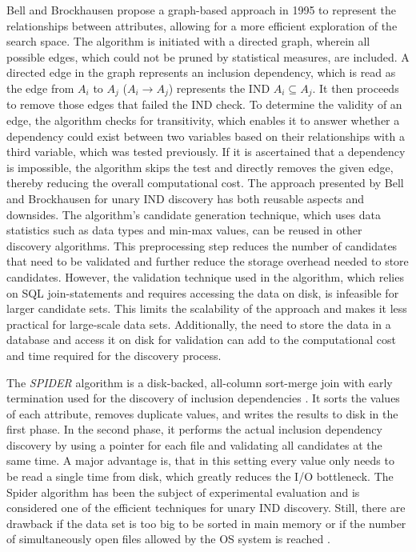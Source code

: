 Bell and Brockhausen \cite{bell1995discovery} propose a graph-based approach in 1995 to represent the relationships between attributes, allowing for a more efficient exploration of the search space. The algorithm is initiated with a directed graph, wherein all possible edges, which could not be pruned by statistical measures, are included. A directed edge in the graph represents an inclusion dependency, which is read as the edge from $A_i$ to $A_j$ ($A_i \rightarrow A_j$) represents the IND $A_i \subseteq A_j$. It then proceeds to remove those edges that failed the IND check. To determine the validity of an edge, the algorithm checks for transitivity, which enables it to answer whether a dependency could exist between two variables based on their relationships with a third variable, which was tested previously. If it is ascertained that a dependency is impossible, the algorithm skips the test and directly removes the given edge, thereby reducing the overall computational cost. The approach presented by Bell and Brockhausen for unary IND discovery has both reusable aspects and downsides. The algorithm's candidate generation technique, which uses data statistics such as data types and min-max values, can be reused in other discovery algorithms. This preprocessing step reduces the number of candidates that need to be validated and further reduce the storage overhead needed to store candidates. However, the validation technique used in the algorithm, which relies on SQL join-statements and requires accessing the data on disk, is infeasible for larger candidate sets. This limits the scalability of the approach and makes it less practical for large-scale data sets. Additionally, the need to store the data in a database and access it on disk for validation can add to the computational cost and time required for the discovery process.

The \textit{SPIDER} algorithm is a disk-backed, all-column sort-merge join with early termination used for the discovery of inclusion dependencies \cite{bauckmann2006efficiently}. It sorts the values of each attribute, removes duplicate values, and writes the results to disk in the first phase. In the second phase, it performs the actual inclusion dependency discovery by using a pointer for each file and validating all candidates at the same time. A major advantage is, that in this setting every value only needs to be read a single time from disk, which greatly reduces the I/O bottleneck. The Spider algorithm has been the subject of experimental evaluation and is considered one of the efficient techniques for unary IND discovery. Still, there are drawback if the data set is too big to be sorted in main memory or if the number of simultaneously open files allowed by the OS system is reached \cite{papenbrock2015divide}.

